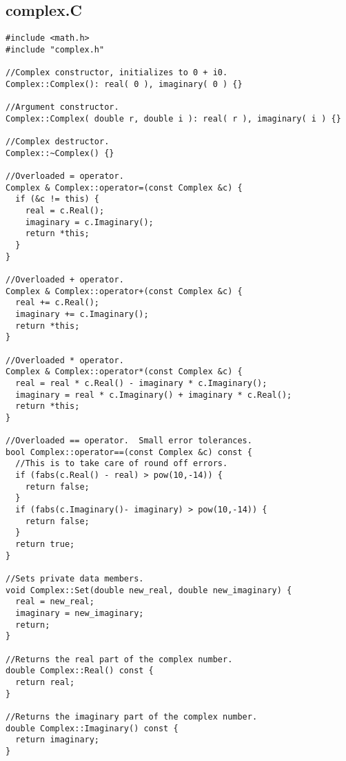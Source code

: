 \documentclass[]{article}
\begin{document}
\subsection{complex.C}
\begin{verbatim}
#include <math.h>
#include "complex.h"

//Complex constructor, initializes to 0 + i0.
Complex::Complex(): real( 0 ), imaginary( 0 ) {}

//Argument constructor.
Complex::Complex( double r, double i ): real( r ), imaginary( i ) {}

//Complex destructor.
Complex::~Complex() {}

//Overloaded = operator.
Complex & Complex::operator=(const Complex &c) {
  if (&c != this) {
    real = c.Real();
    imaginary = c.Imaginary();
    return *this;
  }
}

//Overloaded + operator.
Complex & Complex::operator+(const Complex &c) { 
  real += c.Real();
  imaginary += c.Imaginary(); 
  return *this;
}

//Overloaded * operator.
Complex & Complex::operator*(const Complex &c) { 
  real = real * c.Real() - imaginary * c.Imaginary();
  imaginary = real * c.Imaginary() + imaginary * c.Real();
  return *this;
}

//Overloaded == operator.  Small error tolerances.
bool Complex::operator==(const Complex &c) const {
  //This is to take care of round off errors.
  if (fabs(c.Real() - real) > pow(10,-14)) {
    return false;
  }
  if (fabs(c.Imaginary()- imaginary) > pow(10,-14)) {
    return false;
  }
  return true;
}

//Sets private data members.
void Complex::Set(double new_real, double new_imaginary) {
  real = new_real;
  imaginary = new_imaginary;
  return;
}

//Returns the real part of the complex number.
double Complex::Real() const {
  return real;
}

//Returns the imaginary part of the complex number.
double Complex::Imaginary() const {
  return imaginary;
}
\end{verbatim}
\end{document}
